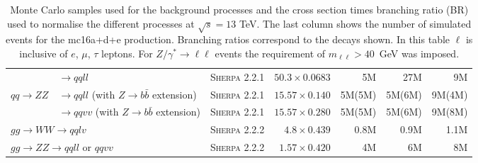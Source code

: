 \begin{table}[tbph]
{\begin{tabular}{lllrrrr}
                                            & $\rightarrow qqll$ & \textsc{Sherpa 2.2.1} & $50.3\times0.0683$ & 5M & 27M & 9M \\
    $qq\rightarrow ZZ$ & $\rightarrow qqll$ (with $Z\rightarrow b\bar{b}$ extension) & \textsc{Sherpa 2.2.1} & $15.57\times0.140$ & 5M(5M)  & 5M(6M) & 9M(4M) \\
                                            & $\rightarrow qqvv$ (with $Z\rightarrow b\bar{b}$ extension) & \textsc{Sherpa 2.2.1} & $15.57\times0.280$ & 5M(5M)  & 5M(6M) & 9M(8M) \\
    \multicolumn{2}{l}{$gg\rightarrow WW \rightarrow qqlv$} & \textsc{Sherpa 2.2.2} & $4.8\times0.439$ & 0.8M & 0.9M & 1.1M \\
    \multicolumn{2}{l}{$gg\rightarrow ZZ \rightarrow qqll$ or $qqvv$} & \textsc{Sherpa 2.2.2} & $1.57\times0.420$ & 4M & 6M & 8M \\
    \bottomrule
  \end{tabular}
}
\caption{Monte Carlo samples used for the background processes and the cross
  section times branching ratio (BR) used to normalise the different processes
  at $\sqrt{s}=13$ TeV. The last column shows the number of simulated events for
  the {mc16a+d+e} production. Branching ratios correspond to the decays shown.
  In this table $\ell$ is inclusive of $e$, $\mu$, $\tau$ leptons. For
  $Z/\gamma^{*} \to \ell\ell$ events the requirement of $m_{\ell\ell}>40$~GeV
  was imposed.
}
\label{tbl:bkgMC}
\end{table}

